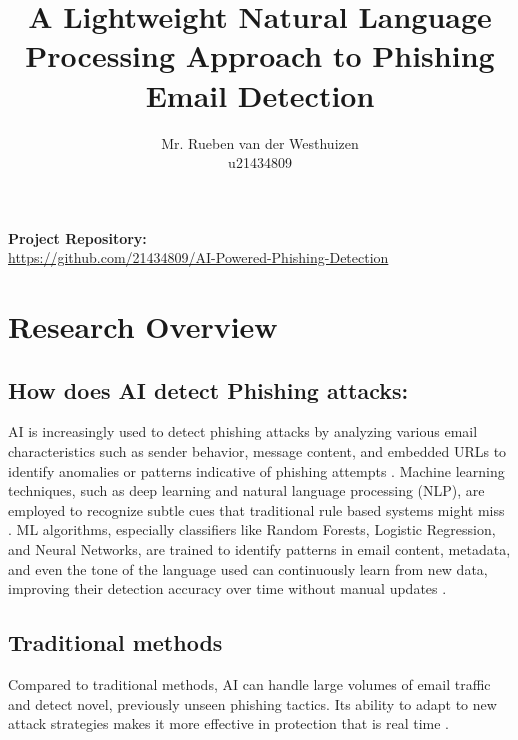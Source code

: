 \documentclass{article}
\title{A Lightweight Natural Language Processing Approach to Phishing Email Detection}
\author{Mr. Rueben van der Westhuizen \\ u21434809}
\begin{document}
\maketitle

\begin{center}
\textbf{Project Repository:} \\[0.5em]
\href{https://github.com/21434809/AI-Powered-Phishing-Detection}{https://github.com/21434809/AI-Powered-Phishing-Detection}
\end{center}

\newpage
\tableofcontents
\newpage

\section{Research Overview}

\subsection{How does AI detect Phishing attacks:}

AI is increasingly used to detect phishing attacks by analyzing various email characteristics such as sender behavior, message content, and embedded URLs to identify anomalies or patterns indicative of phishing attempts \cite{basit2021comprehensive}. Machine learning techniques, such as deep learning and natural language processing (NLP), are employed to recognize subtle cues that traditional rule  based systems might miss \cite{Wang2020Feature} \cite{Lauriola2021An}. ML algorithms, especially classifiers like Random Forests, Logistic Regression, and Neural Networks, are trained to identify patterns in email content, metadata, and even the tone of the language used can continuously learn from new data, improving their detection accuracy over time without manual updates \cite{Karim2019A} \cite{Murti2023Machine}.

\subsection{Traditional methods}

Compared to traditional methods, AI can handle large volumes of email traffic and detect novel, previously unseen phishing tactics. Its ability to adapt to new attack strategies makes it more effective in protection that is real time \cite{Jalil2022Highly} \cite{Alsariera2020AI} \cite{Basit2020A}.
\end{document}
